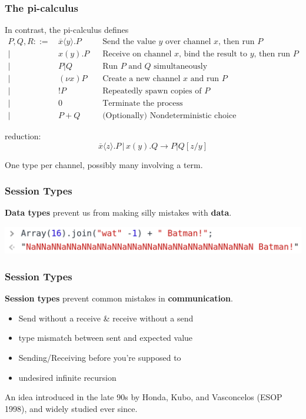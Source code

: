 \documentclass[12pt]{beamer}
\begin{document}
\begin{frame}
\frametitle{The pi-calculus}
In contrast, the pi-calculus defines
\begingroup
\fontsize{10pt}{12pt}\selectfont
\begin{align*}
P, Q, R ::= \, & \overline{x} \langle y \rangle.P \,\,\, \, \, &\text{Send the value }y\text{ over channel }x\text{, then run }P \\
|\,\,\, & x(y).P \,\,\, \, \, & \text{Receive on channel }x\text{, bind the result to }y\text{, then run }P \\
|\,\,\, & P|Q \,\,\, \, \, \, \, \, \, &\text{Run }P\text{ and }Q\text{ simultaneously} \\
|\,\,\, & (\nu x)P  \,\,\, &\text{Create a new channel }x\text{ and run }P \\
|\,\,\, & !P \,\,\, &\text{Repeatedly spawn copies of }P \\
|\,\,\, & 0 & \text{Terminate the process} \\
|\,\,\, & P + Q & \text{(Optionally) Nondeterministic choice}
\end{align*}
\endgroup


reduction: 
$$\overline{x}\langle z \rangle.P\, |\, x(y).Q \rightarrow P | Q[z/y]$$

One type per channel, possibly many involving a term.

\end{frame}


\begin{frame}[t]
\frametitle{Session Types}

\begin{center}
    \textbf{Data types} prevent us from making silly mistakes with \textbf{data}. \linebreak 

\begin{center}
\includegraphics[scale=0.30]{img/batman.png}
\end{center}

\end{center}




\end{frame}

\begin{frame}[t]
\frametitle{Session Types}
    \textbf{Session types} prevent common mistakes in \textbf{communication}.  

\begin{itemize}
    \item Send without a receive \& receive without a send
    \item type mismatch between sent and expected value
    \item Sending/Receiving before you're supposed to
    \item undesired infinite recursion
\end{itemize}

An idea introduced in the late 90s by Honda, Kubo, and Vasconcelos (ESOP 1998), and widely studied ever since. 

\end{frame}
\end{document}
